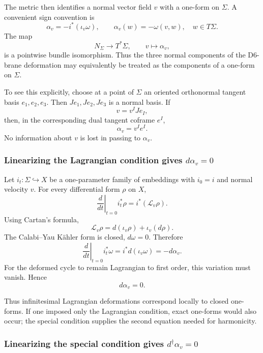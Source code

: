 \documentclass[
  10pt,
  a4paper,
  openany]{book}
\begin{document}
The metric then identifies a normal vector field \(v\) with a one-form
on \(\Sigma\). A convenient sign convention is \[
\alpha_v=-i^*(\iota_v\omega),
\qquad
\alpha_v(w)=-\omega(v,w),\quad w\in T\Sigma.
\] The map \[
N_\Sigma\longrightarrow T^*\Sigma,
\qquad
v\longmapsto\alpha_v,
\] is a pointwise bundle isomorphism. Thus the three normal components
of the D6-brane deformation may equivalently be treated as the
components of a one-form on \(\Sigma\).

To see this explicitly, choose at a point of \(\Sigma\) an oriented
orthonormal tangent basis \(e_1,e_2,e_3\). Then \(Je_1,Je_2,Je_3\) is a
normal basis. If \[
v=v^IJe_I,
\] then, in the corresponding dual tangent coframe \(e^I\), \[
\alpha_v=v^Ie^I.
\] No information about \(v\) is lost in passing to \(\alpha_v\).

\subsubsection{\texorpdfstring{Linearizing the Lagrangian condition
gives
\(d\alpha_v=0\)}{Linearizing the Lagrangian condition gives d\textbackslash alpha\_v=0}}\label{linearizing-the-lagrangian-condition-gives-dalpha_v0}

Let \(i_t:\Sigma\hookrightarrow X\) be a one-parameter family of
embeddings with \(i_0=i\) and normal velocity \(v\). For every
differential form \(\rho\) on \(X\), \[
\left.\frac{d}{dt}\right|_{t=0}i_t^*\rho
=i^*(\mathcal L_v\rho).
\] Using Cartan's formula, \[
\mathcal L_v\rho=d(\iota_v\rho)+\iota_v(d\rho).
\] The Calabi--Yau Kähler form is closed, \(d\omega=0\). Therefore \[
\left.\frac{d}{dt}\right|_{t=0}i_t^*\omega
=i^*d(\iota_v\omega)
=-d\alpha_v.
\] For the deformed cycle to remain Lagrangian to first order, this
variation must vanish. Hence \[
\boxed{d\alpha_v=0}.
\]

Thus infinitesimal Lagrangian deformations correspond locally to closed
one-forms. If one imposed only the Lagrangian condition, exact one-forms
would also occur; the special condition supplies the second equation
needed for harmonicity.

\subsubsection{\texorpdfstring{Linearizing the special condition gives
\(d^\dagger\alpha_v=0\)}{Linearizing the special condition gives d\^{}\textbackslash dagger\textbackslash alpha\_v=0}}\label{linearizing-the-special-condition-gives-ddaggeralpha_v0}
\end{document}
